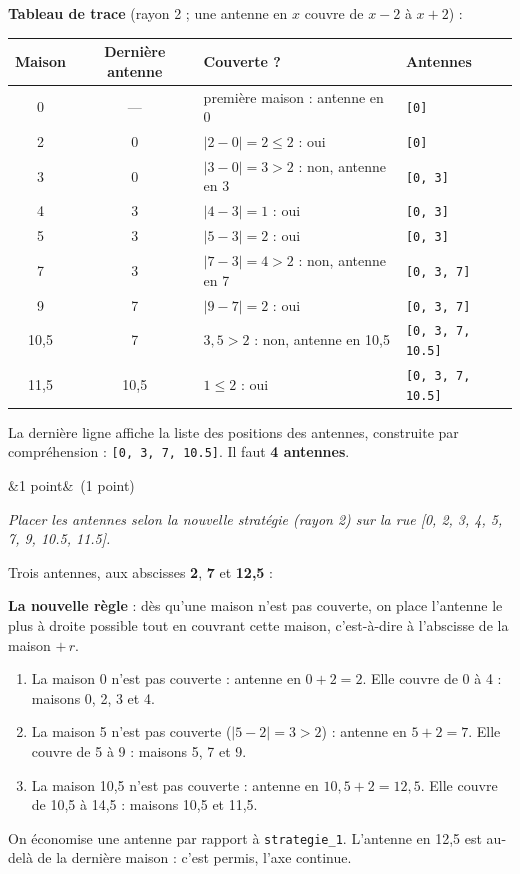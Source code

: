 \documentclass[11pt, a4paper]{exam}
\newcommand{\code}[1]{\texttt{#1}}
\newcommand{\Q}[3]{\par\needspace{5\baselineskip}\bigskip\noindent{\large\bfseries Question #1}\ifx&#2&\else\ \textnormal{(#2)}\fi\par\nopagebreak\smallskip\noindent\textit{#3}\par\nopagebreak\smallskip}
\newcommand{\maison}[1]{\begin{scope}[shift={(#1,0.12)}]\draw (-0.22,0) rectangle (0.22,0.42);\draw (-0.22,0.42) -- (0,0.68) -- (0.22,0.42);\end{scope}}
\newcommand{\antenne}[3]{%
\draw[thick] (#1,-0.05) -- (#1-0.12,-0.75) -- (#1+0.12,-0.75) -- cycle;
\draw[|<->|, thick] (#1-#2,-1.0-#3) -- (#1+#2,-1.0-#3);
\node[font=\scriptsize, fill=white, inner sep=1pt] at (#1,-1.0-#3) {#1};}
\newcommand{\axe}{%
\draw[very thick] (-0.6,0) -- (13.2,0);
\foreach \i in {0,...,13} {\draw (\i,-0.08) -- (\i,0.08);}
\foreach \i in {0,5,10} {\node[above, font=\scriptsize] at (\i,0.75) {\i};}
\foreach \p in {0,2,3,4,5,7,9,10.5,11.5} {\maison{\p}}}
\begin{document}
\textbf{Tableau de trace} (rayon 2 ; une antenne en $x$ couvre de $x - 2$ à $x + 2$) :
\begin{center}
\renewcommand{\arraystretch}{1.15}
\begin{tabular}{|c|c|l|l|}
\hline
\textbf{Maison} & \textbf{Dernière antenne} & \textbf{Couverte ?} & \textbf{Antennes} \\ \hline
0 & --- & première maison : antenne en 0 & \code{[0]} \\
2 & 0 & $|2 - 0| = 2 \leq 2$ : oui & \code{[0]} \\
3 & 0 & $|3 - 0| = 3 > 2$ : non, antenne en 3 & \code{[0, 3]} \\
4 & 3 & $|4 - 3| = 1$ : oui & \code{[0, 3]} \\
5 & 3 & $|5 - 3| = 2$ : oui & \code{[0, 3]} \\
7 & 3 & $|7 - 3| = 4 > 2$ : non, antenne en 7 & \code{[0, 3, 7]} \\
9 & 7 & $|9 - 7| = 2$ : oui & \code{[0, 3, 7]} \\
10,5 & 7 & $3{,}5 > 2$ : non, antenne en 10,5 & \code{[0, 3, 7, 10.5]} \\
11,5 & 10,5 & $1 \leq 2$ : oui & \code{[0, 3, 7, 10.5]} \\ \hline
\end{tabular}
\end{center}
La dernière ligne affiche la liste des positions des antennes, construite par compréhension : \code{[0, 3, 7, 10.5]}. Il faut \textbf{4 antennes}.

\Q{10}{1 point}{Placer les antennes selon la nouvelle stratégie (rayon 2) sur la rue [0, 2, 3, 4, 5, 7, 9, 10.5, 11.5].}
\begin{reponse}
Trois antennes, aux abscisses \textbf{2}, \textbf{7} et \textbf{12,5} :
\begin{center}
\end{center}
\end{reponse}
\textbf{La nouvelle règle} : dès qu'une maison n'est pas couverte, on place l'antenne le plus à droite possible tout en couvrant cette maison, c'est-à-dire à l'abscisse de la maison $+ \, r$.
\begin{enumerate}
\item La maison 0 n'est pas couverte : antenne en $0 + 2 = 2$. Elle couvre de 0 à 4 : maisons 0, 2, 3 et 4.
\item La maison 5 n'est pas couverte ($|5 - 2| = 3 > 2$) : antenne en $5 + 2 = 7$. Elle couvre de 5 à 9 : maisons 5, 7 et 9.
\item La maison 10,5 n'est pas couverte : antenne en $10{,}5 + 2 = 12{,}5$. Elle couvre de 10,5 à 14{,}5 : maisons 10,5 et 11,5.
\end{enumerate}
On économise une antenne par rapport à \code{strategie\_1}. L'antenne en 12,5 est au-delà de la dernière maison : c'est permis, l'axe continue.
\end{document}
